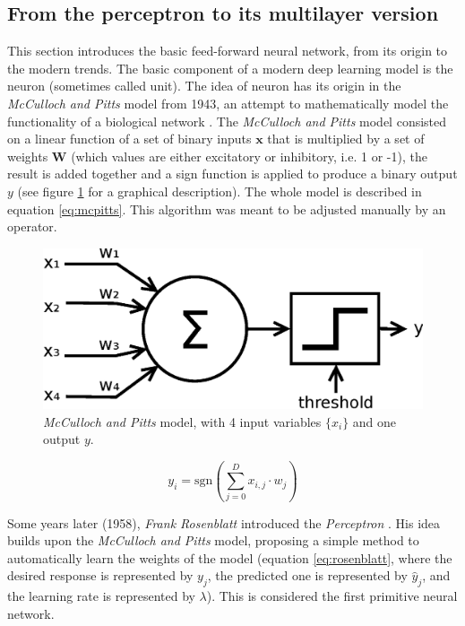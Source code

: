 \subsection{From the perceptron to its multilayer version} \label{sec:mlp}

This section introduces the basic feed-forward neural network, from its origin to the modern trends. The basic component of a modern deep learning model is the neuron (sometimes called unit). The idea of neuron has its origin in the \textit{McCulloch and Pitts} model from 1943, an attempt to mathematically model the functionality of a biological network \autocite{mccullochPitts1943}. The \textit{McCulloch and Pitts} model consisted on a linear function of a set of binary inputs $\mathbf{x}$ that is multiplied by a set of weights $\mathbf{W}$ (which values are either excitatory or inhibitory, i.e. 1 or -1), the result is added together and a sign function is applied to produce a binary output $y$ (see figure \ref{fig:mcpittsneuron} for a graphical description). The whole model is described in equation \ref{eq:mcpitts}. This algorithm was meant to be adjusted manually by an operator.

\begin{figure}
	\centering
	\includegraphics[width=0.60\linewidth]{chapter2/images/mcpittsneuron}
	\caption{\textit{McCulloch and Pitts} model, with 4 input variables $\{x_i\}$ and one output $y$.}
	\label{fig:mcpittsneuron}
\end{figure}

\begin{equation}
	\label{eq:mcpitts}
	y_i = \mathrm{sgn}\left(\sum_{j=0}^{D} x_{i,j} \cdot w_{j} \right)
\end{equation}

Some years later (1958), \textit{Frank Rosenblatt} introduced the \textit{Perceptron} \autocite{Rosenblatt58}. His idea builds upon the \textit{McCulloch and Pitts} model, proposing a simple method to automatically learn the weights of the model (equation \ref{eq:rosenblatt}, where the desired response is represented by $y_j$, the predicted one is represented by $\hat{y}_j$, and the learning rate is represented by $\lambda$). This is considered the first primitive neural network.

